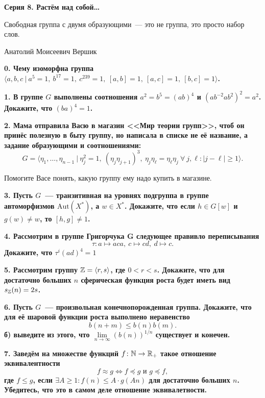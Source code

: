 \documentclass[12pt]{extarticle}
\begin{document}
\begin{landscape}
\begin{multicols}{2}
	\columnbreak

	\centerline{\bf{Серия 8.  Растём над собой\ldots }}

	\epigraph{Свободная группа с двумя образующими~--- это не группа, это просто набор слов.}{Анатолий Моисеевич Вершик}

	\bf{0.} Чему изоморфна группа $\langle a, b, c \ \vert \ a^{5} = 1, \ b^{17} = 1, \ c^{239} = 1, \ [a, b] = 1, \ [a, c] = 1 , \ [b, c] = 1 \rangle$.

	\bf{1.} В группе $G$ выполнены соотношения $a^2 = b^5 = (ab)^4$ и $(a b^{-2} a b^2)^2 = a^2$. Докажите, что $(ba)^4 = 1$. 

	\bf{2.}  Мама отправила Васю в магазин <<Мир теории групп>>, чтоб он принёс полезную в быту группу, но написала в списке не её название, а задание образующими и соотношениями:
	\[
		G = \langle \eta_1, \ldots, \eta_{n - 1} \ \vert \ \eta_j^2 = 1, \ (\eta_j \eta_{j + 1})^3, \ \eta_j \eta_{\ell} = \eta_{\ell} \eta_{j} \ \forall \ j, \ell \colon |j - \ell| \ge 1 \rangle. 
	\]

	Помогите Васе понять, какую группу ему надо купить в магазине. 

	\bf{3.} Пусть $G$~--- транзитивная на уровнях подгруппа в группе автоморфизмов $\mathrm{Aut}(X^*)$, а $w \in X^*$. Докажите, что если $h \in G[w]$ и $g(w) \neq w$, то $[h, g] \neq 1$. 

	\bf{4.} Рассмотрим в группе Григорчука $\mathbf{G}$ следующее правивло переписывания 
	\[
		\tau\colon a \mapsto a c a, \ c \mapsto c d, \ d \mapsto c.
	\]
	Докажите, что $\tau^i(ad)^4 = 1$
	
	 	
	\bf{5.} Рассмотрим группу $\mathbb{Z} = \langle r, s \rangle$, где $0 < r < s$. Докажите, что для достаточно больших $n$ сферическая функция роста будет иметь вид  $s_{\mathbb{Z}}(n) = 2s$.  

	\bf{6.} Пусть $G$~--- произвольная конечнопорожденная группа. Докажите, что для её шаровой функции роста выполнено неравенство
	\[
	 	b(n + m) \le b(n)b(m).
	 \] 
	 б) выведите из этого, что $\lim\limits_{n \to \infty} (b(n))^{1/n}$ существует и конечен.

	  \bf{7.} Заведём на множестве функций $f\colon \mathbb{N} \to \mathbb{R}_{+}$ такое отношение эквивалентности 
	 \[
	 	f \approx g \Leftrightarrow  f \preceq g \text{ и } g \preceq f,
	 \]
	 где $f \leqslant g$, если $\exists A \ge 1\colon f(n) \le A \cdot g(An)$ для достаточно больших $n$. Убедитесь, что это в самом деле отношение эквивалетности. 

	\end{multicols}
	\end{landscape}
\end{document}
